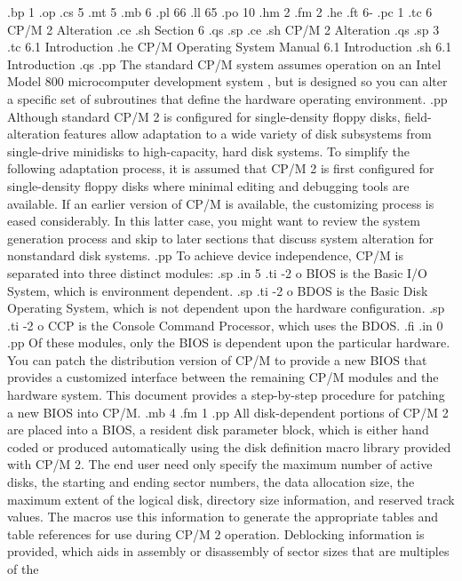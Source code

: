 .bp 1 
.op
.cs 5
.mt 5
.mb 6
.pl 66
.ll 65
.po 10
.hm 2
.fm 2
.he 
.ft                                6-%
.pc 1
.tc 6  CP/M 2 Alteration
.ce
.sh
Section 6
.qs
.sp
.ce
.sh
CP/M 2 Alteration
.qs
.sp 3
.tc    6.1  Introduction
.he CP/M Operating System Manual                    6.1  Introduction
.sh
6.1  Introduction
.qs
.pp
The standard CP/M system assumes operation on an Intel Model 
800 microcomputer development system , but is designed so you can alter a 
specific set of subroutines that define the hardware operating 
environment.  
.pp
Although standard CP/M 2 is configured for single-density floppy 
disks, field-alteration features allow adaptation to a wide 
variety of disk subsystems from single-drive minidisks to 
high-capacity, hard disk systems.  To simplify the following 
adaptation process, it is assumed that CP/M 2 is first 
configured for single-density floppy disks where minimal editing 
and debugging tools are available.  If an earlier version of CP/M 
is available, the customizing process is eased considerably.  In 
this latter case, you might want to review the system 
generation process and skip to later sections that discuss system 
alteration for nonstandard disk systems. 
.pp
To achieve device independence, CP/M is separated into three 
distinct modules:
.sp
.in 5
.ti -2
o BIOS is the Basic I/O System, which is environment dependent.
.sp
.ti -2
o BDOS is the Basic Disk Operating System, which is not dependent upon the 
hardware configuration.
.sp
.ti -2
o CCP is the Console Command Processor, which uses the BDOS.
.fi
.in 0
.pp
Of these modules, only the BIOS is dependent upon the particular 
hardware.  You can patch the distribution version 
of CP/M to provide a new BIOS that provides a customized 
interface between the remaining CP/M modules and the 
hardware system.  This document provides a step-by-step 
procedure for patching a new BIOS into CP/M.
.mb 4
.fm 1
.pp
All disk-dependent portions of CP/M 2 are placed into a BIOS, a 
resident disk parameter block, which is either hand coded or 
produced automatically using the disk definition macro library 
provided with CP/M 2.  The end user need only specify the maximum 
number of active disks, the starting and ending sector numbers, 
the data allocation size, the maximum extent of the logical disk, 
directory size information, and reserved track values.  
The macros use this information to generate 
the appropriate tables and table references for use during CP/M 2 
operation.  Deblocking information is provided, which aids in 
assembly or disassembly of sector sizes that are multiples of the 
